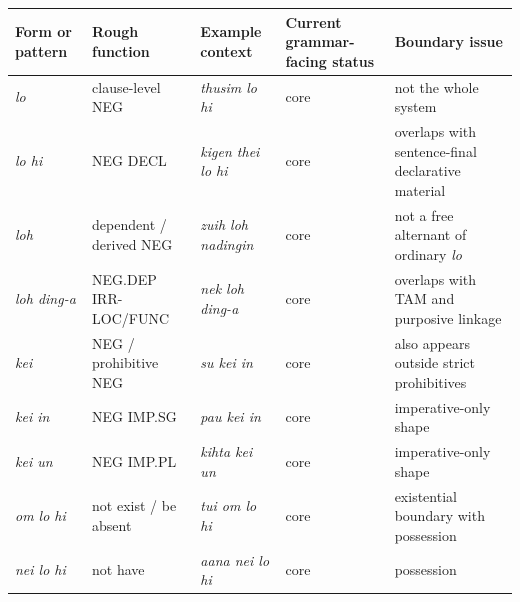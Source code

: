 \documentclass[
  11pt,
  a4paper,
]{article}
\newcounter{none} %
\newcommand{\tdim}[1]{\textit{#1}}
\begin{document}
{\def\LTcaptype{none} %
\begin{longtable}[]{@{}
  >{\raggedright\arraybackslash}p{}
  >{\raggedright\arraybackslash}p{}
  >{\raggedright\arraybackslash}p{}
  >{\raggedright\arraybackslash}p{}
  >{\raggedright\arraybackslash}p{}@{}}
\toprule\noalign{}
\begin{minipage}[b]{\linewidth}\raggedright
Form or pattern
\end{minipage} & \begin{minipage}[b]{\linewidth}\raggedright
Rough function
\end{minipage} & \begin{minipage}[b]{\linewidth}\raggedright
Example context
\end{minipage} & \begin{minipage}[b]{\linewidth}\raggedright
Current grammar-facing status
\end{minipage} & \begin{minipage}[b]{\linewidth}\raggedright
Boundary issue
\end{minipage} \\
\midrule\noalign{}
\endhead
\bottomrule\noalign{}
\endlastfoot
\tdim{lo} & clause-level NEG & \tdim{thusim lo hi} & core & not the
whole system \\
\tdim{lo hi} & NEG DECL & \tdim{kigen thei lo hi} & core & overlaps with
sentence-final declarative material \\
\tdim{loh} & dependent / derived NEG & \tdim{zuih loh nadingin} & core &
not a free alternant of ordinary \tdim{lo} \\
\tdim{loh ding-a} & NEG.DEP IRR-LOC/FUNC & \tdim{nek loh ding-a} & core
& overlaps with TAM and purposive linkage \\
\tdim{kei} & NEG / prohibitive NEG & \tdim{su kei in} & core & also
appears outside strict prohibitives \\
\tdim{kei in} & NEG IMP.SG & \tdim{pau kei in} & core & imperative-only
shape \\
\tdim{kei un} & NEG IMP.PL & \tdim{kihta kei un} & core &
imperative-only shape \\
\tdim{om lo hi} & not exist / be absent & \tdim{tui om lo hi} & core &
existential boundary with possession \\
\tdim{nei lo hi} & not have & \tdim{aana nei lo hi} & core & possession

\end{longtable}}
\end{document}
